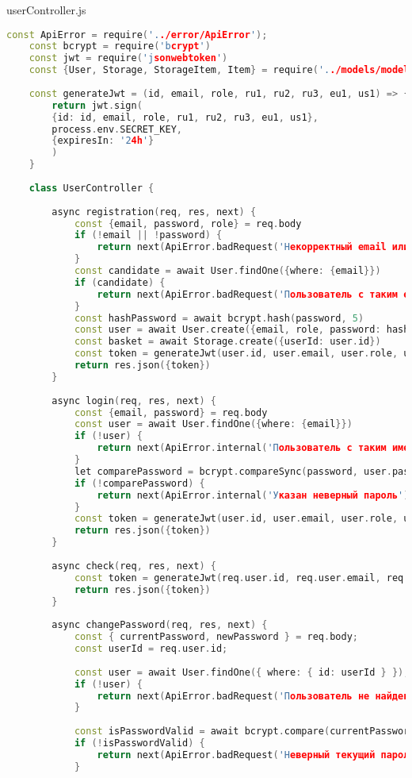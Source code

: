 userController.js
\begin{lstlisting}[language=C++]
	const ApiError = require('../error/ApiError');
	const bcrypt = require('bcrypt')
	const jwt = require('jsonwebtoken')
	const {User, Storage, StorageItem, Item} = require('../models/models')
	
	const generateJwt = (id, email, role, ru1, ru2, ru3, eu1, us1) => {
		return jwt.sign(
		{id: id, email, role, ru1, ru2, ru3, eu1, us1}, 
		process.env.SECRET_KEY,
		{expiresIn: '24h'}
		)
	}
	
	class UserController {
		
		async registration(req, res, next) {
			const {email, password, role} = req.body
			if (!email || !password) {
				return next(ApiError.badRequest('Некорректный email или password'))
			}
			const candidate = await User.findOne({where: {email}})
			if (candidate) {
				return next(ApiError.badRequest('Пользователь с таким email уже существует'))
			}
			const hashPassword = await bcrypt.hash(password, 5)
			const user = await User.create({email, role, password: hashPassword})
			const basket = await Storage.create({userId: user.id})
			const token = generateJwt(user.id, user.email, user.role, user.ru1, user.ru2, user.ru3, user.eu1, user.us1)
			return res.json({token})
		}
		
		async login(req, res, next) {
			const {email, password} = req.body
			const user = await User.findOne({where: {email}})
			if (!user) {
				return next(ApiError.internal('Пользователь с таким именем не найден'))
			}
			let comparePassword = bcrypt.compareSync(password, user.password)
			if (!comparePassword) {
				return next(ApiError.internal('Указан неверный пароль'))
			}
			const token = generateJwt(user.id, user.email, user.role, user.ru1, user.ru2, user.ru3, user.eu1, user.us1)
			return res.json({token})
		}
		
		async check(req, res, next) {
			const token = generateJwt(req.user.id, req.user.email, req.user.role, req.user.ru1, req.user.ru2, req.user.ru3, req.user.eu1, req.user.us1)
			return res.json({token})
		}
		
		async changePassword(req, res, next) {
			const { currentPassword, newPassword } = req.body;
			const userId = req.user.id;
			
			const user = await User.findOne({ where: { id: userId } });
			if (!user) {
				return next(ApiError.badRequest('Пользователь не найден'));
			}
			
			const isPasswordValid = await bcrypt.compare(currentPassword, user.password);
			if (!isPasswordValid) {
				return next(ApiError.badRequest('Неверный текущий пароль'));
			}
			

\end{lstlisting}
